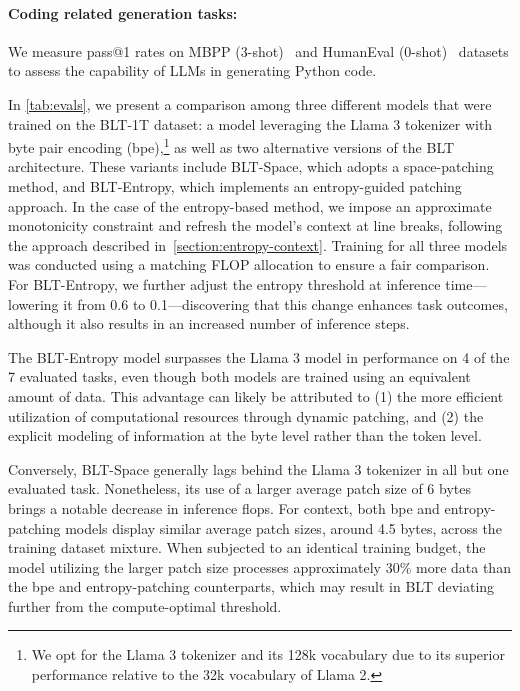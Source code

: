 \paragraph{Coding related generation tasks:} We measure pass@1 rates on MBPP (3-shot)~\citep{Eval_MBPP} and HumanEval (0-shot)~\citep{Eval_HumanEval} datasets to assess the capability of LLMs in generating Python code.

In \autoref{tab:evals}, we present a comparison among three different models that were trained on the {\textsc BLT}-1T dataset: a model leveraging the Llama 3 tokenizer with byte pair encoding (bpe),\footnote{We opt for the Llama 3 tokenizer and its 128k vocabulary due to its superior performance relative to the 32k vocabulary of Llama 2.} as well as two alternative versions of the {\textsc BLT} architecture. These variants include {\textsc BLT}-Space, which adopts a space-patching method, and {\textsc BLT}-Entropy, which implements an entropy-guided patching approach. In the case of the entropy-based method, we impose an approximate monotonicity constraint and refresh the model’s context at line breaks, following the approach described in~\autoref{section:entropy-context}. Training for all three models was conducted using a matching FLOP allocation to ensure a fair comparison. For {\textsc BLT}-Entropy, we further adjust the entropy threshold at inference time—lowering it from 0.6 to 0.1—discovering that this change enhances task outcomes, although it also results in an increased number of inference steps.

The {\textsc BLT}-Entropy model surpasses the Llama 3 model in performance on 4 of the 7 evaluated tasks, even though both models are trained using an equivalent amount of data. This advantage can likely be attributed to (1) the more efficient utilization of computational resources through dynamic patching, and (2) the explicit modeling of information at the byte level rather than the token level.

Conversely, {\textsc BLT}-Space generally lags behind the Llama 3 tokenizer in all but one evaluated task. Nonetheless, its use of a larger average patch size of 6 bytes brings a notable decrease in inference flops. For context, both bpe and entropy-patching models display similar average patch sizes, around 4.5 bytes, across the training dataset mixture. When subjected to an identical training budget, the model utilizing the larger patch size processes approximately 30\% more data than the bpe and entropy-patching counterparts, which may result in {\textsc BLT} deviating further from the compute-optimal threshold.

